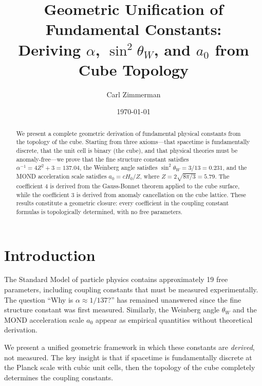 \documentclass[twocolumn,showpacs,preprintnumbers,amsmath,amssymb,prd]{revtex4-2}
\begin{document}
\title{Geometric Unification of Fundamental Constants:\\
Deriving $\alpha$, $\sin^2\theta_W$, and $a_0$ from Cube Topology}

\author{Carl Zimmerman}

\date{\today}

\begin{abstract}
We present a complete geometric derivation of fundamental physical constants from the topology of the cube. Starting from three axioms---that spacetime is fundamentally discrete, that the unit cell is binary (the cube), and that physical theories must be anomaly-free---we prove that the fine structure constant satisfies $\alpha^{-1} = 4Z^2 + 3 = 137.04$, the Weinberg angle satisfies $\sin^2\theta_W = 3/13 = 0.231$, and the MOND acceleration scale satisfies $a_0 = cH_0/Z$, where $Z = 2\sqrt{8\pi/3} = 5.79$. The coefficient 4 is derived from the Gauss-Bonnet theorem applied to the cube surface, while the coefficient 3 is derived from anomaly cancellation on the cube lattice. These results constitute a geometric closure: every coefficient in the coupling constant formulas is topologically determined, with no free parameters.
\end{abstract}


\maketitle

\section{Introduction}

The Standard Model of particle physics contains approximately 19 free parameters, including coupling constants that must be measured experimentally. The question ``Why is $\alpha \approx 1/137$?'' has remained unanswered since the fine structure constant was first measured. Similarly, the Weinberg angle $\theta_W$ and the MOND acceleration scale $a_0$ appear as empirical quantities without theoretical derivation.

We present a unified geometric framework in which these constants are \emph{derived}, not measured. The key insight is that if spacetime is fundamentally discrete at the Planck scale with cubic unit cells, then the topology of the cube completely determines the coupling constants.
\end{document}
